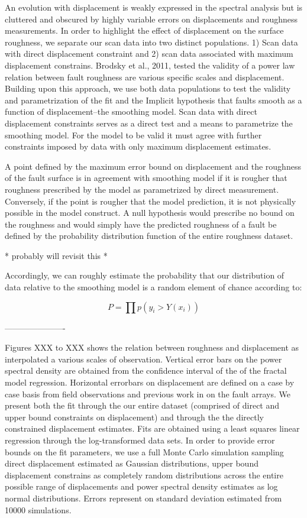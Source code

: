 \documentclass[12pt,a4paper]{article}
\begin{document}
An evolution with displacement is weakly expressed in the spectral analysis but is cluttered and obscured by highly variable errors on displacements and roughness measurements. In order to highlight the effect of displacement on the surface roughness, we separate our scan data into two distinct populations. 1) Scan data with direct displacement constraint and 2) scan data associated with maximum displacement constrains.  Brodsky et al., 2011, tested the validity of a power law relation between fault roughness are various specific scales and displacement. Building upon this approach, we use both data populations to test the validity and parametrization of the fit and the Implicit hypothesis that faults smooth as a function of displacement--the smoothing model. Scan data with direct displacement constraints serves as a direct test and a means to parametrize the smoothing model. For the model to be valid it must agree with further constraints imposed by data with only maximum displacement estimates.

A point defined by the maximum error bound on displacement and the roughness of the fault surface is in agreement with smoothing model if it is rougher that roughness prescribed by the model as parametrized by direct measurement. Conversely, if the point is rougher that the model prediction, it is not physically possible in the model construct. A null hypothesis would prescribe no bound on the roughness and would simply have the predicted roughness of a fault be defined by the probability distribution function of the entire roughness dataset.

* probably will revisit this *

Accordingly, we can roughly estimate the probability that our distribution of data relative to the smoothing model is a random element of chance according to:

\begin{equation}
 P = \prod p(y_i>Y(x_i))
\end{equation} 
 
 
----------------------

Figures XXX to XXX shows the relation between roughness and displacement as interpolated a various scales of observation. Vertical error bars on the power spectral density are obtained from the confidence interval of the of the fractal model regression. Horizontal errorbars on displacement are defined on a case by case basis from field observations and previous work in on the fault arrays. We present both the fit through the our entire dataset (comprised of direct and upper bound constraints on displacement) and through the the directly constrained displacement estimates. Fits are obtained using a least squares linear regression through the log-transformed data sets. In order to provide error bounds on the fit parameters, we use a full Monte Carlo simulation sampling direct displacement estimated as Gaussian distributions, upper bound displacement constrains as completely random distributions across the entire possible range of displacements and power spectral density estimates as log normal distributions. Errors represent on standard deviation estimated from 10000 simulations.
\end{document}
